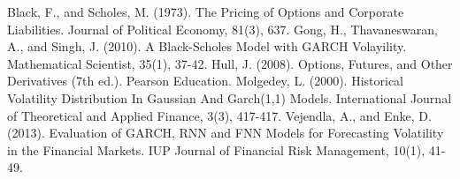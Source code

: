 \begin{thebibliography}{99}
Black, F., and Scholes, M. (1973). The Pricing of Options and Corporate Liabilities. Journal of Political 	Economy, 81(3), 637.
Gong, H., Thavaneswaran, A., and Singh, J. (2010). A Black-Scholes Model with GARCH Volayility. 	Mathematical Scientist, 35(1), 37-42.
Hull, J. (2008). Options, Futures, and Other Derivatives (7th ed.). Pearson Education.
Molgedey, L. (2000). Historical Volatility Distribution In Gaussian And Garch(1,1) Models. 	International Journal of Theoretical and Applied Finance, 3(3), 417-417.
Vejendla, A., and Enke, D. (2013). Evaluation of GARCH, RNN and FNN Models for Forecasting 	Volatility in the Financial Markets. IUP Journal of Financial Risk Management, 10(1), 41-49.
\end{thebibliography}